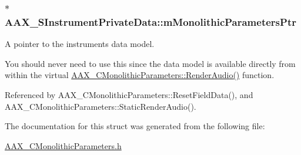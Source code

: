 \subsubsection[{m\+Monolithic\+Parameters\+Ptr}]{$\ast$ A\+A\+X\+\_\+\+S\+Instrument\+Private\+Data\+::m\+Monolithic\+Parameters\+Ptr}\label{a00122_a92919c61cae3c04a28bfacb3c48d0120}


A pointer to the instrument\textquotesingle{}s data model. 

You should never need to use this since the data model is available directly from within the virtual \hyperlink{a00026_a04f2f73d70ea28c17747c68fc3a20fc8}{A\+A\+X\+\_\+\+C\+Monolithic\+Parameters\+::\+Render\+Audio()} function. 

Referenced by A\+A\+X\+\_\+\+C\+Monolithic\+Parameters\+::\+Reset\+Field\+Data(), and A\+A\+X\+\_\+\+C\+Monolithic\+Parameters\+::\+Static\+Render\+Audio().



The documentation for this struct was generated from the following file\+:\begin{DoxyCompactItemize}
\item 
\hyperlink{a00178}{A\+A\+X\+\_\+\+C\+Monolithic\+Parameters.\+h}\end{DoxyCompactItemize}
